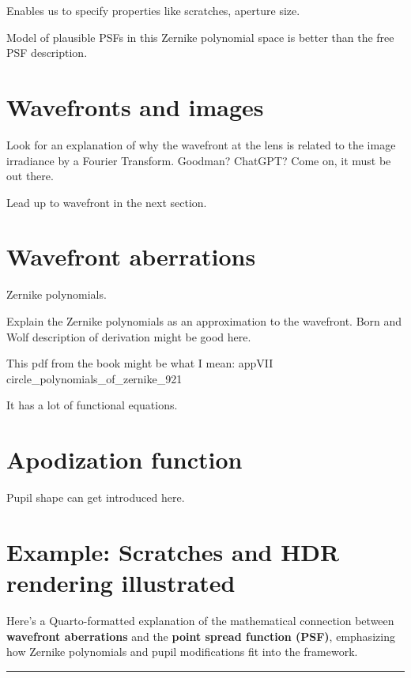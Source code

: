 \documentclass[
  letterpaper,
]{book}
\begin{document}
Enables us to specify properties like scratches, aperture size.

Model of plausible PSFs in this Zernike polynomial space is better than
the free PSF description.

\section{Wavefronts and images}\label{wavefronts-and-images}

Look for an explanation of why the wavefront at the lens is related to
the image irradiance by a Fourier Transform. Goodman? ChatGPT? Come on,
it must be out there.

Lead up to wavefront in the next section.

\section{Wavefront aberrations}\label{wavefront-aberrations}

Zernike polynomials.

Explain the Zernike polynomials as an approximation to the wavefront.
Born and Wolf description of derivation might be good here.

This pdf from the book might be what I mean: appVII
circle\_polynomials\_of\_zernike\_921

It has a lot of functional equations.

\section{Apodization function}\label{apodization-function}

Pupil shape can get introduced here.

\section{Example: Scratches and HDR rendering
illustrated}\label{example-scratches-and-hdr-rendering-illustrated}

Here's a Quarto-formatted explanation of the mathematical connection
between \textbf{wavefront aberrations} and the \textbf{point spread
function (PSF)}, emphasizing how Zernike polynomials and pupil
modifications fit into the framework.

\begin{center}\rule{0.5\linewidth}{0.5pt}\end{center}
\end{document}
